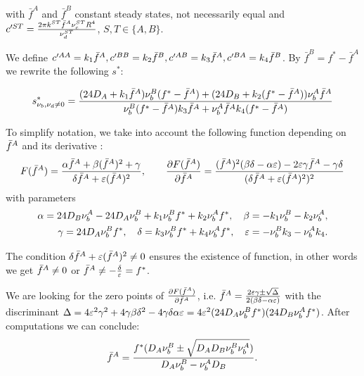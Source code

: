 with $\bar{f}^A$ and $\bar{f}^B$ constant steady states, not necessarily equal and 
$c'^{ST}=\frac{2\pi k^{ST} {\bar{f}^A} \nu_c^{ST} R^{4}}{\nu_d^{ST}}$, $S,T \in \{ A,B \}$.

We define $c'^{AA}=k_1 {\bar{f}^A}, c'^{BB}=k_2{\bar{f}^B}, c'^{AB}=k_3{\bar{f}^A}, c'^{BA}=k_4{\bar{f}^B}$.
By $\bar{f}^B=f^*-\bar{f}^A$ we rewrite the following $s^*$:

\begin{equation}
s^{*}_{\nu_b,\nu_d \ne 0}=\frac{(24 D_A+k_1{\bar{f}^A})\nu_{b}^{B}(f^*-{\bar{f}^A})+(24 D_B+k_2(f^*-{\bar{f}^A}))\nu_{b}^{A}\bar{f}^A}{\nu_{b}^{B}(f^*-{\bar{f}^A})k_3{\bar{f}^A}+\nu_{b}^{A}\bar{f}^Ak_4(f^*-{\bar{f}^A})}
\end{equation}

To simplify notation, we take into account the following function depending on ${\bar{f}^A}$ and its derivative :
$$F({\bar{f}^A})=\frac{{\alpha} {\bar{f}^A} + {\beta} ({\bar{f}^A})^2 + {\gamma}}{{\delta} {\bar{f}^A} + \varepsilon({\bar{f}^A})^2}, \quad\quad 
\frac{{\partial} F({\bar{f}^A})}{{\partial} {\bar{f}^A}}=\frac{({\bar{f}^A})^2({\beta} {\delta}-{\alpha} \varepsilon)-2\varepsilon {\gamma} {\bar{f}^A} - {\gamma}{\delta}}{({\delta} {\bar{f}^A}+\varepsilon ({\bar{f}^A})^2)^2}$$ 
with parameters 
\begin{align}
{\alpha}= 24D_B \nu_b^A -24 D_A \nu_b^B +k_1 \nu_b^B f^* + k_2 \nu_b^A f^*, \quad
{\beta}=-k_1 \nu_b^B -k_2 \nu_b^A, \\
{\gamma}= 24 D_A \nu_b^B f^*, \quad 
{\delta}= k_3\nu_b^B f^*+k_4 \nu_b^A f^*, \quad
\varepsilon= -\nu_b^B k_3-	\nu_b^A k_4.
\end{align}

\begin{remark}
	The condition ${\delta} {\bar{f}^A} + \varepsilon ({\bar{f}^A})^2 \ne 0 $ ensures the existence of function, in other words we get  ${\bar{f}^A} \ne 0 $ or ${\bar{f}^A} \ne -\frac{{\delta}}{\varepsilon}=f^*$. 
\end{remark}

We are looking for the zero points of $\frac{{\partial} F({\bar{f}^A})}{{\partial} {\bar{f}^A}}$, i.e. 
$ {\bar{f}^A}=\frac{2 \varepsilon {\gamma} \pm \sqrt{\Delta}}{2({\beta} {\delta} - {\alpha} \varepsilon )} $ with the discriminant
$\Delta=4\varepsilon^2 {\gamma}^2 + 4 {\gamma} {\beta} {\delta}^2 -4 {\gamma} {\delta} {\alpha} \varepsilon = 4\varepsilon^2(24D_A \nu_b^B f^*)(24 D_B \nu_b^A f^*)$. After computations we can conclude:
\begin{equation}
{\bar{f}^A}=\frac{f^*(D_A \nu_b^B \pm \sqrt{D_A D_B \nu_b^B \nu_b^A})}{D_A \nu_b^B -\nu_b^A D_B}.
\end{equation}









